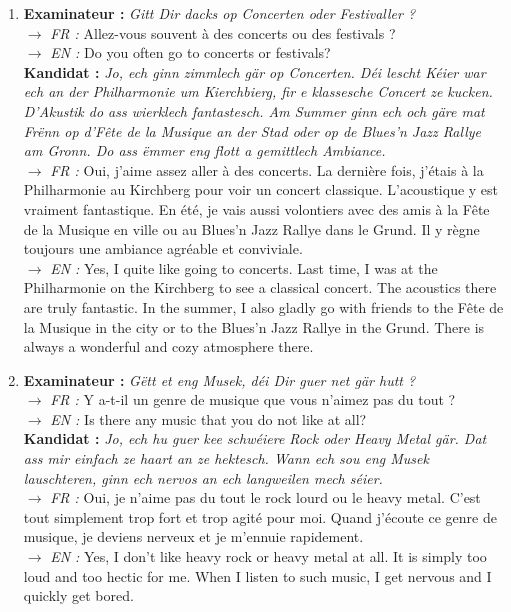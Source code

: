 \begin{enumerate}
    \item \textbf{Examinateur :} \textit{Gitt Dir dacks op Concerten oder Festivaller ?} \\
    $\rightarrow$ \textit{FR :} Allez-vous souvent à des concerts ou des festivals ? \\
    $\rightarrow$ \textit{EN :} Do you often go to concerts or festivals? \\
    \textbf{Kandidat :} \textit{Jo, ech ginn zimmlech gär op Concerten. Déi lescht Kéier war ech an der Philharmonie um Kierchbierg, fir e klassesche Concert ze kucken. D'Akustik do ass wierklech fantastesch. Am Summer ginn ech och gäre mat Frënn op d'Fête de la Musique an der Stad oder op de Blues'n Jazz Rallye am Gronn. Do ass ëmmer eng flott a gemittlech Ambiance.} \\
    $\rightarrow$ \textit{FR :} Oui, j'aime assez aller à des concerts. La dernière fois, j'étais à la Philharmonie au Kirchberg pour voir un concert classique. L'acoustique y est vraiment fantastique. En été, je vais aussi volontiers avec des amis à la Fête de la Musique en ville ou au Blues'n Jazz Rallye dans le Grund. Il y règne toujours une ambiance agréable et conviviale. \\
    $\rightarrow$ \textit{EN :} Yes, I quite like going to concerts. Last time, I was at the Philharmonie on the Kirchberg to see a classical concert. The acoustics there are truly fantastic. In the summer, I also gladly go with friends to the Fête de la Musique in the city or to the Blues'n Jazz Rallye in the Grund. There is always a wonderful and cozy atmosphere there.

    \vspace{0.4em}

    \item \textbf{Examinateur :} \textit{Gëtt et eng Musek, déi Dir guer net gär hutt ?} \\
    $\rightarrow$ \textit{FR :} Y a-t-il un genre de musique que vous n'aimez pas du tout ? \\
    $\rightarrow$ \textit{EN :} Is there any music that you do not like at all? \\
    \textbf{Kandidat :} \textit{Jo, ech hu guer kee schwéiere Rock oder Heavy Metal gär. Dat ass mir einfach ze haart an ze hektesch. Wann ech sou eng Musek lauschteren, ginn ech nervos an ech langweilen mech séier.} \\
    $\rightarrow$ \textit{FR :} Oui, je n'aime pas du tout le rock lourd ou le heavy metal. C'est tout simplement trop fort et trop agité pour moi. Quand j'écoute ce genre de musique, je deviens nerveux et je m'ennuie rapidement. \\
    $\rightarrow$ \textit{EN :} Yes, I don't like heavy rock or heavy metal at all. It is simply too loud and too hectic for me. When I listen to such music, I get nervous and I quickly get bored.
\end{enumerate}

